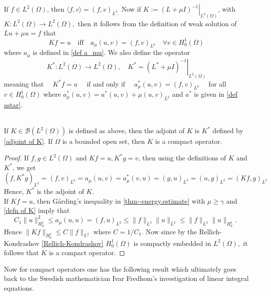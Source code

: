 \documentclass[11pt]{article}
\begin{document}
			If \(f \in L^{2}(\Omega)\), then \(\langle f, v\rangle=(f, v)_{L^{2} .}\)  Now if \( K:=\left.(L+\mu I)^{-1}\right|_{L^{2}(\Omega)}\), with $K: L^{2}(\Omega) \rightarrow L^{2}(\Omega),$ then it follows from the definition of weak
            solution of \(L u+\mu u=f\) that
            \begin{equation}\label{defn of K}
            K f=u \quad \mathrm{iff}\quad a_{\mu}(u, v)=(f, v)_{L^{2}} \quad \forall v \in H_{0}^{1}(\Omega)
            \end{equation}
            where \(a_{\mu}\) is defined in \eqref{def a_mu}.
            We also define the operator
            \begin{equation}\label{adjoint of K}
                K^{*}: L^{2}(\Omega) \rightarrow L^{2}(\Omega), \quad K^{*}=\left.\left(L^{*}+\mu I\right)^{-1}\right|_{L^{2}(\Omega)}
            \end{equation}
            meaning that
            \(\quad K^{*} f=u \quad\) if and only if \(\quad a_{\mu}^{*}(u, v)=(f, v)_{L^{2}} \quad\) for all \(v \in H_{0}^{1}(\Omega)\)
            where \(a_{\mu}^{*}(u, v)=a^{*}(u, v)+\mu(u, v)_{L^{2}}\) and \(a^{*}\) is given in \eqref{def astar}.
            
            \begin{thm}\label{compact op theorem}\phantom{k}\\
                If \(K \in \mathcal{B}\left(L^{2}(\Omega)\right)\) is defined as above, then the adjoint of \(K\) is
                \(K^{*}\) defined by \eqref{adjoint of K}. If \(\Omega\) is a bounded open set, then \(K\) is a compact operator.
            \end{thm}
            \begin{proof}
                If \(f, g \in L^{2}(\Omega)\) and \(K f=u, K^{*} g=v\), then using the definitions of $K$ and $K^*$,
                we get
                \(\left(f, K^{*} g\right)_{L^{2}}=(f, v)_{L^{2}}=a_{\mu}(u, v)=a_{\mu}^{*}(v, u)=(g, u)_{L^{2}}=(u, g)_{L^{2}}=(K f, g)_{L^{2}}\)
                Hence, \(K^{*}\) is the adjoint of \(K\).\\
                If \(K f=u\), then G\aa rding's inequality in \autoref{thm--energy.estimate} with \(\mu \geq \gamma\) and \eqref{defn of K} imply that
                $$
                C_{1}\|u\|_{H_{0}^{1}}^{2} \leq a_{\mu}(u, u)=(f, u)_{L^{2}} \leq\|f\|_{L^{2}}\|u\|_{L^{2}} \leq\|f\|_{L^{2}}\|u\|_{H_{0}^{1}} \text {. }
                $$
                Hence \(\|K f\|_{H_{0}^{1}} \leq C\|f\|_{L^{2}}\) where \(C=1 / C_{1}\). Now since by the Rellich-Kondrashov \autoref{Rellich-Kondrashov} $H^1_{0}(\Omega)$ is compactly embedded in $L^2(\Omega),$ it follows that \(K\) is a compact operator.
            \end{proof}
            Now for compact operators one has the following result which ultimately goes back to the Swedish mathematician  Ivar Fredhom's investigation of linear integral equations.
            
\end{document}
